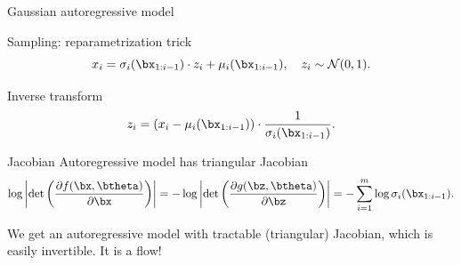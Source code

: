 \begin{frame}{Gaussian autoregressive model}
	\begin{block}{Sampling: reparametrization trick}
		\vspace{-0.2cm}
		\[
			x_i = \sigma_i (\bx_{1:i-1}) \cdot z_i + \mu_i(\bx_{1:i-1}), \quad z_i \sim \mathcal{N}(0, 1).
		\]
		\vspace{-0.5cm}
	\end{block}
	\begin{block}{Inverse transform}
		\vspace{-0.3cm}
		\[
		z_i = \left(x_i - \mu_i(\bx_{1:i-1}) \right) \cdot \frac{1}{\sigma_i (\bx_{1:i-1}) }.
		\]
		\vspace{-0.5cm}
	\end{block}
	\begin{block}{Jacobian}
		Autoregressive model has triangular Jacobian
		\vspace{-0.2cm}
		\[
		\log \left|\det \left( \frac{\partial f(\bx, \btheta)}{\partial \bx} \right) \right| = -\log \left|\det \left( \frac{\partial g(\bz, \btheta)}{\partial \bz} \right) \right| = - \sum_{i = 1}^m \log \sigma_i (\bx_{1:i-1}).
		\]
		\vspace{-0.3cm}
	\end{block} 
	We get an autoregressive model with tractable (triangular) Jacobian, which is easily invertible. It is a flow!
\end{frame}
